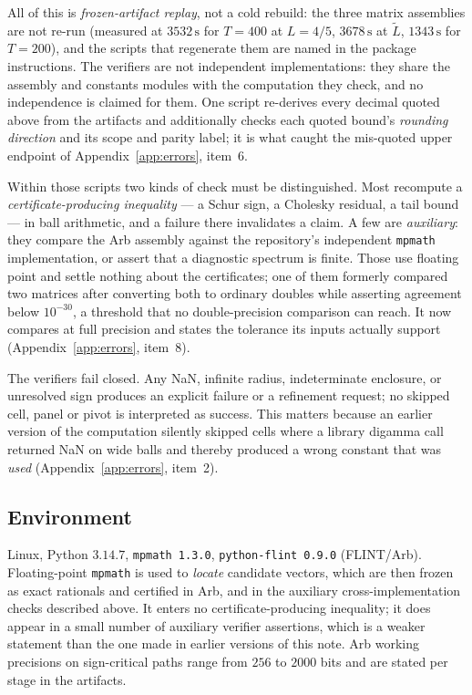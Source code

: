 \documentclass[11pt,a4paper]{article}
\theoremstyle{definition}
\theoremstyle{remark}
\newcommand{\src}[1]{{\footnotesize\texttt{#1}}}
\begin{document}
All of this is \emph{frozen-artifact replay}, not a cold rebuild: the three
matrix assemblies are not re-run (measured at $3532\,\mathrm{s}$ for $T = 400$ at
$L = 4/5$, $3678\,\mathrm{s}$ at $\widetilde L$, $1343\,\mathrm{s}$ for
$T = 200$), and the scripts that regenerate them are named in the package
instructions. The verifiers are not independent implementations: they share the
assembly and constants modules with the computation they check, and no
independence is claimed for them. One script re-derives every decimal quoted
above from the artifacts and additionally checks each quoted bound's
\emph{rounding direction} and its scope and parity label; it is what caught the
mis-quoted upper endpoint of Appendix~\ref{app:errors}, item~6.

Within those scripts two kinds of check must be distinguished. Most recompute a
\emph{certificate-producing inequality} --- a Schur sign, a Cholesky residual, a
tail bound --- in ball arithmetic, and a failure there invalidates a claim.
A few are \emph{auxiliary}: they compare the Arb assembly against the
repository's independent \src{mpmath} implementation, or assert that a
diagnostic spectrum is finite. Those use floating point and settle nothing about
the certificates; one of them formerly compared two matrices after converting
both to ordinary doubles while asserting agreement below $10^{-30}$, a threshold
that no double-precision comparison can reach. It now compares at full precision
and states the tolerance its inputs actually support
(Appendix~\ref{app:errors}, item~8).

The verifiers fail closed. Any NaN, infinite radius, indeterminate enclosure, or
unresolved sign produces an explicit failure or a refinement request; no skipped
cell, panel or pivot is interpreted as success. This matters because an earlier
version of the computation silently skipped cells where a library digamma call
returned NaN on wide balls and thereby produced a wrong constant that was
\emph{used} (Appendix~\ref{app:errors}, item~2).

\subsection{Environment}

Linux, Python $3.14.7$, \src{mpmath 1.3.0}, \src{python-flint 0.9.0} (FLINT/Arb).
Floating-point \src{mpmath} is used to \emph{locate} candidate vectors, which
are then frozen as exact rationals and certified in Arb, and in the auxiliary
cross-implementation checks described above. It enters no
certificate-producing inequality; it does appear in a small number of auxiliary
verifier assertions, which is a weaker statement than the one made in earlier
versions of this note. Arb working precisions on sign-critical paths range from
$256$ to $2000$ bits and are stated per stage in the artifacts.
\end{document}
